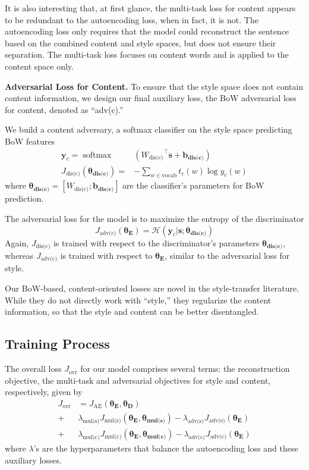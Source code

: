 \documentclass[11pt,a4paper]{article}
\newcommand{\loss}[1]{J_{\text{#1}}}
\newcommand{\hyp}[1]{\lambda_{\text{#1}}}
\newcommand{\nnweight}[1]{\bm{\theta_{\text{#1}}}}
\newcommand{\weight}[1]{W_{\text{#1}}}
\newcommand{\bias}[1]{\bm{b_{\text{#1}}}}
\begin{document}
It is also interesting that, at first glance, the multi-task loss for content appears to be redundant to the autoencoding loss, when in fact, it is not.  The autoencoding loss only requires that the model could reconstruct the sentence based on the combined content and style spaces, but does not ensure their separation. The multi-task loss focuses on content words and is applied to the content space only.

\textbf{Adversarial Loss for Content.} To ensure that the style space does not contain content information, we design our final auxiliary loss, the BoW adversarial loss for content, denoted as ``adv(c).''

We build a content adversary, a softmax classifier on the style space predicting BoW features
\begin{align}
	\label{eqn:adv-bow-disc-loss}
	\bm y_c   = \operatorname{softmax} & ({\weight{dis(c)}}^\top \bm s + \bias{dis(c)})     \\
	\loss{dis(c)}(\nnweight{dis(c)}) = & - \sum\limits_{w\in\text{vocab}} t_c(w)\log y_c(w)
\end{align}
where $\nnweight{dis(c)}=[\weight{dis(c)}; \bias{dis(c)}]$ are the classifier's parameters for BoW prediction.

The adversarial loss for the model is to maximize the entropy of the discriminator
\begin{equation}
	\loss{adv(c)}(\nnweight{E}) = \mathcal{H}(\bm y_c | \bm s; \nnweight{dis(c)})
\end{equation}
Again, $\loss{dis(c)}$ is trained with respect to the discriminator's parameters $\nnweight{dis(c)}$, whereas $\loss{adv(c)}$ is trained with respect to $\nnweight{E}$, similar to the adversarial loss for style.

Our BoW-based, content-oriented losses are novel in the style-transfer literature.
While they do not directly work with ``style,'' they regularize the content information, so that the style and content can be better disentangled.


\subsection{Training Process}

The overall loss $\loss{ovr}$ for our model comprises several terms: the reconstruction objective, the multi-task and adversarial objectives for style and content, respectively, given by
\begin{align}
	\loss{ovr} & =  \loss{AE}(\nnweight{E}, \nnweight{D})                                                                         \\
	+          & \hyp{mul(s)} \loss{mul(s)} (\nnweight{E},\nnweight{mul(s)}) - \hyp{adv(s)} \loss{adv(s)}(\nnweight{E}) \nonumber \\
	+          & \hyp{mul(c)} \loss{mul(c)} (\nnweight{E},\nnweight{mul(c)}) - \hyp{adv(c)} \loss{adv(c)}(\nnweight{E}) \nonumber
\end{align}
where $\lambda$'s are the hyperparameters that balance the autoencoding loss and these auxiliary losses.
\end{document}
